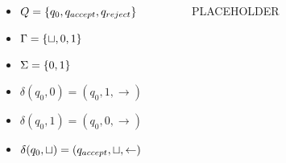 \documentclass[c]{beamer}
\begin{document}
\begin{frame}
  \begin{columns}[c]
    
    \small

    \column{2in}

    \begin{itemize}
    \item $Q = \{q_0, q_{accept}, q_{reject}\}$
    \item $\Gamma = \{\sqcup, 0, 1\}$
    \item $\Sigma = \{0,1\}$
    \item $\delta(q_0, 0) = (q_0, 1, \rightarrow)$
    \item $\delta(q_0, 1) = (q_0, 0, \rightarrow)$
    \item $\delta(q_0, \sqcup) = (q_{accept}, \sqcup, \leftarrow)$
    \end{itemize}

    \column{2in}
    
    \begin{figure}[p]
      
      PLACEHOLDER
      
    \end{figure}
    
  \end{columns}
\end{frame}
\end{document}

